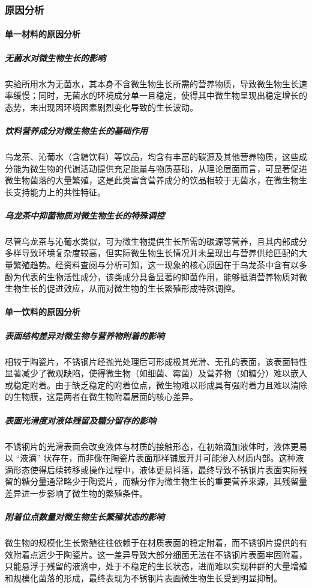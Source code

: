 \documentclass[12pt,a4paper]{ctexart}
\begin{document}
\subsubsection{原因分析}
\paragraph{单一材料的原因分析}
\subparagraph{无菌水对微生物生长的影响}
实验所用水为无菌水，其本身不含微生物生长所需的营养物质，导致微生物生长速率缓慢；同时，无菌水的环境成分单一且稳定，使得其中微生物呈现出稳定增长的态势，未出现因环境因素剧烈变化导致的生长波动。
\subparagraph{饮料营养成分对微生物生长的基础作用}
乌龙茶、沁葡水（含糖饮料）等饮品，均含有丰富的碳源及其他营养物质，这些成分能为微生物的代谢活动提供充足能量与物质基础，从理论层面而言，可显著促进微生物菌落的大量繁殖，这是此类富含营养成分的饮品相较于无菌水，在微生物生长支持能力上的共性特征。
\subparagraph{乌龙茶中抑菌物质对微生物生长的特殊调控}
尽管乌龙茶与沁葡水类似，可为微生物提供生长所需的碳源等营养，且其内部成分多样导致环境复杂度较高，但实际微生物生长情况并未呈现出与营养供给匹配的大量繁殖趋势。经资料查阅与分析可知，这一现象的核心原因在于乌龙茶中含有以多酚为代表的生物活性成分\cite{HXSJ202002001}，该类成分具备显著的抑菌作用，能够抵消营养物质对微生物生长的促进效应，从而对微生物的生长繁殖形成特殊调控。

\paragraph{单一饮料的原因分析}
\subparagraph{表面结构差异对微生物与营养物附着的影响}
相较于陶瓷片，不锈钢片经抛光处理后可形成极其光滑、无孔的表面，该表面特性显著减少了微观缺陷，使得微生物（如细菌、霉菌）及营养物（如糖分）难以嵌入或稳定附着。由于缺乏稳定的附着位点，微生物难以形成具有强附着力且难以清除的生物膜，这是两者在微生物附着层面的核心差异。
\subparagraph{表面光滑度对液体残留及糖分留存的影响}
不锈钢片的光滑表面会改变液体与材质的接触形态，在初始滴加液体时，液体更易以 “液滴” 状存在，而非像在陶瓷片表面那样铺展开并可能渗入材质内部。这种液滴形态使得后续转移或操作过程中，液体更易抖落，最终导致不锈钢片表面实际残留的糖分量通常略少于陶瓷片，而糖分作为微生物生长的重要营养来源，其残留量差异进一步影响了微生物的繁殖条件。
\subparagraph{附着位点数量对微生物生长繁殖状态的影响}
微生物的规模化生长繁殖往往依赖于在材质表面的稳定附着，而不锈钢片提供的有效附着点远少于陶瓷片。这一差异导致大部分细菌无法在不锈钢片表面牢固附着，只能悬浮于残留的液滴中，处于不稳定的生长状态，进而难以实现种群的大量增殖和规模化菌落的形成，最终表现为不锈钢片表面微生物生长受到明显抑制。
\end{document}
